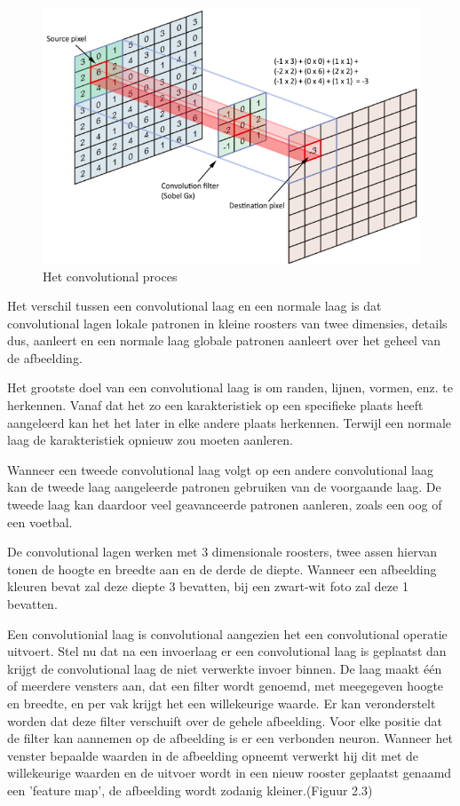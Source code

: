 \begin{figure}
	
	
	\includegraphics[width=\linewidth]{img/convolution.png}
	\caption{Het convolutional proces}
	
\end{figure}

Het verschil tussen een convolutional laag en een normale laag is dat convolutional lagen 
lokale patronen in kleine roosters van twee dimensies, details dus, aanleert en een normale laag globale patronen aanleert over het geheel van de afbeelding.

Het grootste doel van een convolutional laag is om randen, lijnen, vormen, enz. te herkennen.
Vanaf dat het zo een karakteristiek op een specifieke plaats heeft aangeleerd kan het het later in elke andere plaats herkennen. Terwijl een normale laag de karakteristiek opnieuw zou moeten aanleren.

Wanneer een tweede convolutional laag volgt op een andere convolutional laag kan de tweede laag aangeleerde patronen gebruiken van de voorgaande laag.
De tweede laag kan daardoor veel geavanceerde patronen aanleren, zoals een oog of een voetbal.

De convolutional lagen werken met 3 dimensionale roosters, twee assen hiervan tonen de hoogte en breedte aan en de derde de diepte. Wanneer een afbeelding kleuren bevat zal deze diepte 3 bevatten, bij een zwart-wit foto zal deze 1 bevatten.

Een convolutionial laag is convolutional aangezien het een convolutional operatie uitvoert.
Stel nu dat na een invoerlaag er een convolutional laag is geplaatst
dan krijgt de convolutional laag de niet verwerkte invoer binnen.
De laag maakt één of meerdere vensters aan, dat een filter wordt genoemd, met meegegeven hoogte en breedte, en per vak krijgt het een willekeurige waarde. Er kan veronderstelt worden dat deze filter verschuift over de gehele afbeelding. Voor elke positie dat de filter kan aannemen op de afbeelding is er een verbonden neuron.
Wanneer het venster bepaalde waarden in de afbeelding opneemt verwerkt hij dit met de willekeurige waarden en de uitvoer wordt in een nieuw rooster geplaatst  genaamd een 'feature map', de afbeelding wordt zodanig kleiner.(Figuur 2.3)

